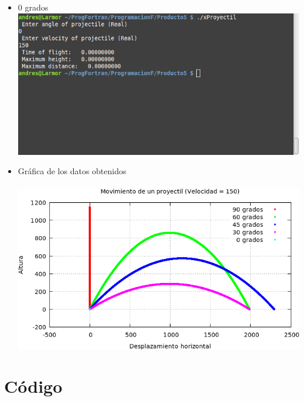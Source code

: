 \documentclass{article}
\begin{document}
\begin{itemize}
\item 0 grados\\
\includegraphics[scale=.5]{0}
\item Gr\'afica de los datos obtenidos\\ \\
\includegraphics[scale=.6]{proyectiles}


\end{itemize}


\section{C\'odigo}
\end{document}
